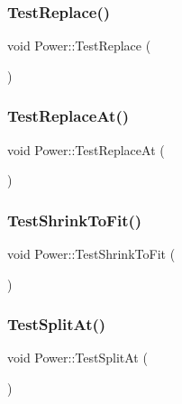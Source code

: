 \mbox{\label{namespace_power_aa5f53535e79018dee986c4d6c732dfa2}} 
\subsubsection{\texorpdfstring{Test\+Replace()}{TestReplace()}}
{\footnotesize\ttfamily void Power\+::\+Test\+Replace (\begin{DoxyParamCaption}{ }\end{DoxyParamCaption})}

\mbox{\label{namespace_power_a8bfbc26ed7a2c9816a299ed990302283}} 
\subsubsection{\texorpdfstring{Test\+Replace\+At()}{TestReplaceAt()}}
{\footnotesize\ttfamily void Power\+::\+Test\+Replace\+At (\begin{DoxyParamCaption}{ }\end{DoxyParamCaption})}

\mbox{\label{namespace_power_ae23123cd183d3656e9fcdb0ca4b54aab}} 
\subsubsection{\texorpdfstring{Test\+Shrink\+To\+Fit()}{TestShrinkToFit()}}
{\footnotesize\ttfamily void Power\+::\+Test\+Shrink\+To\+Fit (\begin{DoxyParamCaption}{ }\end{DoxyParamCaption})}

\mbox{\label{namespace_power_a7319d9f5b0f4f0a3773c4c7efe7a4759}} 
\subsubsection{\texorpdfstring{Test\+Split\+At()}{TestSplitAt()}}
{\footnotesize\ttfamily void Power\+::\+Test\+Split\+At (\begin{DoxyParamCaption}{ }\end{DoxyParamCaption})}

